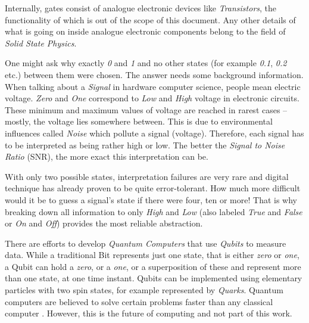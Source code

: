 Internally, gates consist of analogue electronic devices like \emph{Transistors},
the functionality of which is out of the scope of this document. Any other
details of what is going on inside analogue electronic components belong to the
field of \emph{Solid State Physics}.

One might ask why exactly \emph{0} and \emph{1} and no other states (for example
\emph{0.1}, \emph{0.2} etc.) between them were chosen. The answer needs some
background information. When talking about a \emph{Signal} in hardware computer
science, people mean electric voltage. \emph{Zero} and \emph{One} correspond to
\emph{Low} and \emph{High} voltage in electronic circuits. These minimum and
maximum values of voltage are reached in rarest cases -- mostly, the voltage lies
somewhere between. This is due to environmental influences called \emph{Noise}
which pollute a signal (voltage). Therefore, each signal has to be interpreted
as being rather high or low. The better the \emph{Signal to Noise Ratio} (SNR),
the more exact this interpretation can be.

With only two possible states, interpretation failures are very rare and digital
technique has already proven to be quite error-tolerant. How much more difficult
would it be to guess a signal's state if there were four, ten or more! That is
why breaking down all information to only \emph{High} and \emph{Low} (also
labeled \emph{True} and \emph{False} or \emph{On} and \emph{Off}) provides the
most reliable abstraction.

There are efforts to develop \emph{Quantum Computers} that use \emph{Qubits} to
measure data. While a traditional Bit represents just one state, that is either
\emph{zero} or \emph{one}, a Qubit can hold a \emph{zero}, or a \emph{one}, or
a superposition of these and represent more than one state, at one time instant.
Qubits can be implemented using elementary particles with two spin states, for
example represented by \emph{Quarks}. Quantum computers are believed to solve
certain problems faster than any classical computer \cite{wikipedia}. However,
this is the future of computing and not part of this work.
